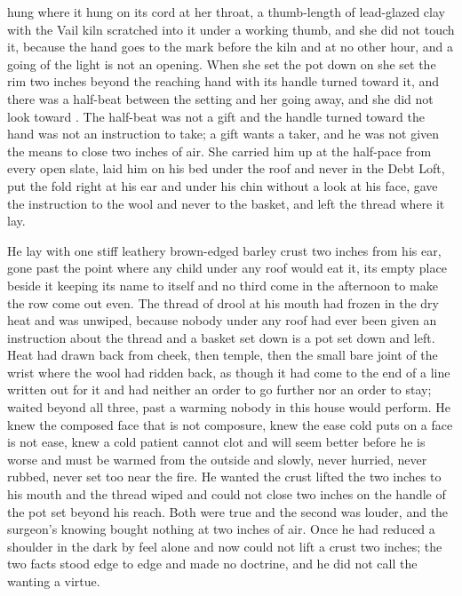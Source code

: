  hung where it hung on its cord at her throat, a thumb-length of lead-glazed clay with the Vail kiln scratched into it under a working thumb, and she did not touch it, because the hand goes to the mark before the kiln and at no other hour, and a going of the light is not an opening. When she set the pot down on  she set the rim two inches beyond the reaching hand with its handle turned toward it, and there was a half-beat between the setting and her going away, and she did not look toward . The half-beat was not a gift and the handle turned toward the hand was not an instruction to take; a gift wants a taker, and he was not given the means to close two inches of air. She carried him up at the half-pace from every open slate, laid him on his bed under the roof and never in the Debt Loft, put the fold right at his ear and under his chin without a look at his face, gave the instruction to the wool and never to the basket, and left the thread where it lay.

He lay with one stiff leathery brown-edged barley crust two inches from his ear, gone past the point where any child under any roof would eat it, its empty place beside it keeping its name to itself and no third come in the afternoon to make the row come out even. The thread of drool at his mouth had frozen in the dry heat and was unwiped, because nobody under any roof had ever been given an instruction about the thread and a basket set down is a pot set down and left. Heat had drawn back from cheek, then temple, then the small bare joint of the wrist where the wool had ridden back, as though it had come to the end of a line written out for it and had neither an order to go further nor an order to stay;  waited beyond all three, past a warming nobody in this house would perform. He knew the composed face that is not composure, knew the ease cold puts on a face is not ease, knew a cold patient cannot clot and will seem better before he is worse and must be warmed from the outside and slowly, never hurried, never rubbed, never set too near the fire. He wanted the crust lifted the two inches to his mouth and the thread wiped and could not close two inches on the handle of the pot set beyond his reach. Both were true and the second was louder, and the surgeon's knowing bought nothing at two inches of air. Once he had reduced a shoulder in the dark by feel alone and now could not lift a crust two inches; the two facts stood edge to edge and made no doctrine, and he did not call the wanting a virtue.

